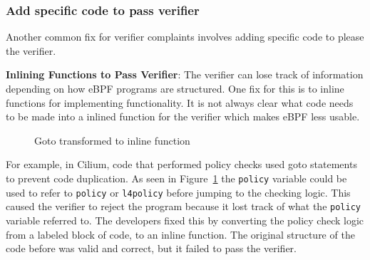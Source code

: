 \subsubsection{Add specific code to pass verifier}
\label{motivation:add-code}
Another common fix for verifier complaints involves adding specific code to please
    the verifier.

%

\noindent\textbf{Inlining Functions to Pass Verifier}:
The verifier can lose track of information depending on how eBPF programs are structured.
One fix for this is to inline functions for implementing functionality.
It is not always clear what code needs to be made into a inlined function for the verifier
    which makes eBPF less usable.

\begin{figure}
    
    \vspace{-10pt}
    \caption{Goto transformed to inline function}
    \vspace{-10pt}
    \label{fig:inline-fig}
\end{figure}

%
%

For example, in Cilium, code that performed policy checks used goto statements to prevent code duplication.
As seen in Figure~\ref{fig:inline-fig} the \texttt{policy} variable could be used to refer to \texttt{policy} or \texttt{l4policy} before jumping to the checking logic.
This caused the verifier to reject the program because it lost track of what the \texttt{policy} variable referred to.
The developers fixed this by converting the policy check logic from a labeled block of code, to an inline function.
The original structure of the code before was valid and correct, but it failed to pass the verifier.

